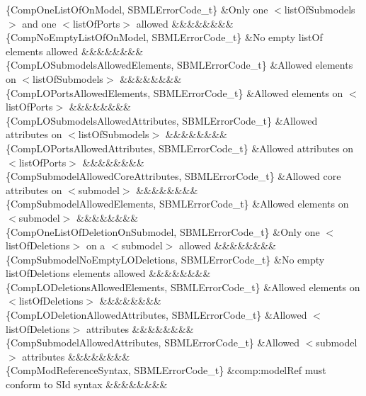\begin{DoxyParagraph}{}
\begin{longtabu}
\{Comp\+One\+List\+Of\+On\+Model, S\+B\+M\+L\+Error\+Code\+\_\+t\} &Only one {\ttfamily $<$list\+Of\+Submodels$>$} and one {\ttfamily $<$list\+Of\+Ports$>$} allowed &&&&&&&&\\
\{Comp\+No\+Empty\+List\+Of\+On\+Model, S\+B\+M\+L\+Error\+Code\+\_\+t\} &No empty list\+Of elements allowed &&&&&&&&\\
\{Comp\+L\+O\+Submodels\+Allowed\+Elements, S\+B\+M\+L\+Error\+Code\+\_\+t\} &Allowed elements on {\ttfamily $<$list\+Of\+Submodels$>$} &&&&&&&&\\
\{Comp\+L\+O\+Ports\+Allowed\+Elements, S\+B\+M\+L\+Error\+Code\+\_\+t\} &Allowed elements on {\ttfamily $<$list\+Of\+Ports$>$} &&&&&&&&\\
\{Comp\+L\+O\+Submodels\+Allowed\+Attributes, S\+B\+M\+L\+Error\+Code\+\_\+t\} &Allowed attributes on {\ttfamily $<$list\+Of\+Submodels$>$} &&&&&&&&\\
\{Comp\+L\+O\+Ports\+Allowed\+Attributes, S\+B\+M\+L\+Error\+Code\+\_\+t\} &Allowed attributes on {\ttfamily $<$list\+Of\+Ports$>$} &&&&&&&&\\
\{Comp\+Submodel\+Allowed\+Core\+Attributes, S\+B\+M\+L\+Error\+Code\+\_\+t\} &Allowed core attributes on {\ttfamily $<$submodel$>$} &&&&&&&&\\
\{Comp\+Submodel\+Allowed\+Elements, S\+B\+M\+L\+Error\+Code\+\_\+t\} &Allowed elements on {\ttfamily $<$submodel$>$} &&&&&&&&\\
\{Comp\+One\+List\+Of\+Deletion\+On\+Submodel, S\+B\+M\+L\+Error\+Code\+\_\+t\} &Only one {\ttfamily $<$list\+Of\+Deletions$>$} on a {\ttfamily $<$submodel$>$} allowed &&&&&&&&\\
\{Comp\+Submodel\+No\+Empty\+L\+O\+Deletions, S\+B\+M\+L\+Error\+Code\+\_\+t\} &No empty list\+Of\+Deletions elements allowed &&&&&&&&\\
\{Comp\+L\+O\+Deletions\+Allowed\+Elements, S\+B\+M\+L\+Error\+Code\+\_\+t\} &Allowed elements on {\ttfamily $<$list\+Of\+Deletions$>$} &&&&&&&&\\
\{Comp\+L\+O\+Deletion\+Allowed\+Attributes, S\+B\+M\+L\+Error\+Code\+\_\+t\} &Allowed {\ttfamily $<$list\+Of\+Deletions$>$} attributes &&&&&&&&\\
\{Comp\+Submodel\+Allowed\+Attributes, S\+B\+M\+L\+Error\+Code\+\_\+t\} &Allowed {\ttfamily $<$submodel$>$} attributes &&&&&&&&\\
\{Comp\+Mod\+Reference\+Syntax, S\+B\+M\+L\+Error\+Code\+\_\+t\} &\textquotesingle{}comp\+:model\+Ref\textquotesingle{} must conform to S\+Id syntax &&&&&&&&\\

\end{longtabu}
\end{DoxyParagraph}
